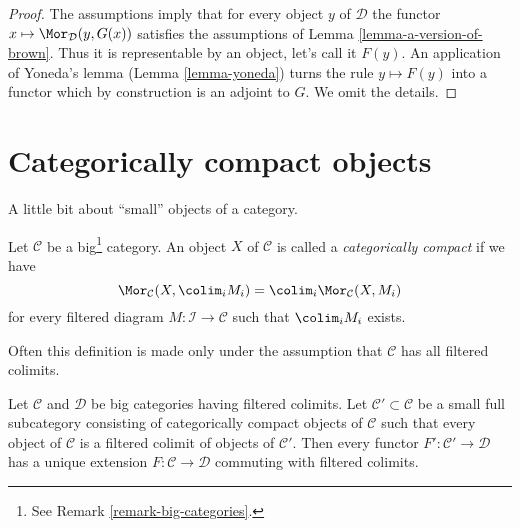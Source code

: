 \begin{proof}
The assumptions imply that for every object $y$ of $\mathcal{D}$
the functor $x \mapsto \Mor_\mathcal{D}(y, G(x))$ satisfies the
assumptions of Lemma \ref{lemma-a-version-of-brown}.
Thus it is representable by an object, let's call it $F(y)$.
An application of Yoneda's lemma (Lemma \ref{lemma-yoneda})
turns the rule $y \mapsto F(y)$ into a functor which
by construction is an adjoint to $G$. We omit the details.
\end{proof}





\section{Categorically compact objects}
\label{section-compact}

\noindent
A little bit about ``small'' objects of a category.

\begin{definition}
\label{definition-compact-object}
Let $\mathcal{C}$ be a big\footnote{See Remark \ref{remark-big-categories}.}
category. An object $X$ of $\mathcal{C}$ is called a {\it categorically compact}
if we have
$$
\Mor_\mathcal{C}(X, \colim_i M_i) =
\colim_i \Mor_\mathcal{C}(X, M_i)
$$
for every filtered diagram $M : \mathcal{I} \to \mathcal{C}$ such that
$\colim_i M_i$ exists.
\end{definition}

\noindent
Often this definition is made only under the assumption that $\mathcal{C}$
has all filtered colimits.

\begin{lemma}
\label{lemma-extend-functor-by-colim}
Let $\mathcal{C}$ and $\mathcal{D}$ be big categories having filtered
colimits. Let $\mathcal{C}' \subset \mathcal{C}$ be a small full subcategory
consisting of categorically compact objects of $\mathcal{C}$ such that every
object of $\mathcal{C}$ is a filtered colimit of objects of $\mathcal{C}'$.
Then every functor $F' : \mathcal{C}' \to \mathcal{D}$ has a unique
extension $F : \mathcal{C} \to \mathcal{D}$ commuting with filtered colimits.
\end{lemma}

